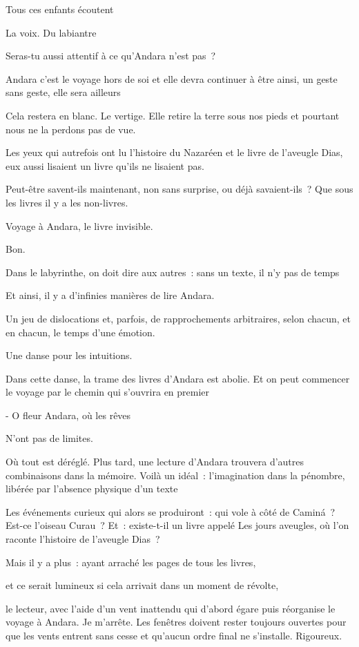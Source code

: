 Tous ces enfants écoutent

La voix. Du labiantre

\pagebreak

Seras-tu aussi attentif à ce qu'Andara n'est pas~?

Andara c'est le voyage hors de soi et elle devra continuer à être ainsi,
un geste sans geste, elle sera ailleurs

Cela restera en blanc. Le vertige. Elle retire la terre sous nos pieds
et pourtant nous ne la perdons pas de vue.

Les yeux qui autrefois ont lu l'histoire du Nazaréen et le livre de
l'aveugle Dias, eux aussi lisaient un livre qu'ils ne lisaient pas.

Peut-être savent-ils maintenant, non sans surprise, ou déjà
savaient-ils~? Que sous les livres il y a les non-livres.

Voyage à Andara, le livre invisible.

\pagebreak

Bon.

Dans le labyrinthe, on doit dire aux autres~: sans un texte, il n'y pas
de temps

Et ainsi, il y a d'infinies manières de lire Andara.

Un jeu de dislocations et, parfois, de rapprochements arbitraires, selon
chacun, et en chacun, le temps d'une émotion.

Une danse pour les intuitions.

\pagebreak

Dans cette danse, la trame des livres d'Andara est abolie. Et on peut
commencer le voyage par le chemin qui s'ouvrira en premier

- O fleur Andara, où les rêves

N'ont pas de limites.

Où tout est déréglé. Plus tard, une lecture d'Andara trouvera d'autres
combinaisons dans la mémoire. Voilà un idéal~: l'imagination dans la
pénombre, libérée par l'absence physique d'un texte

Les événements curieux qui alors se produiront~: qui vole à côté de
Caminá~? Est-ce l'oiseau Curau~? Et~: existe-t-il un livre appelé Les
jours aveugles, où l'on raconte l'histoire de l'aveugle Dias~?

Mais il y a plus~: ayant arraché les pages de tous les livres,

et ce serait lumineux si cela arrivait dans un moment de révolte,

le lecteur, avec l'aide d'un vent inattendu qui d'abord égare puis
réorganise le voyage à Andara. Je m'arrête. Les fenêtres doivent rester
toujours ouvertes pour que les vents entrent sans cesse et qu'aucun
ordre final ne s'installe. Rigoureux.

